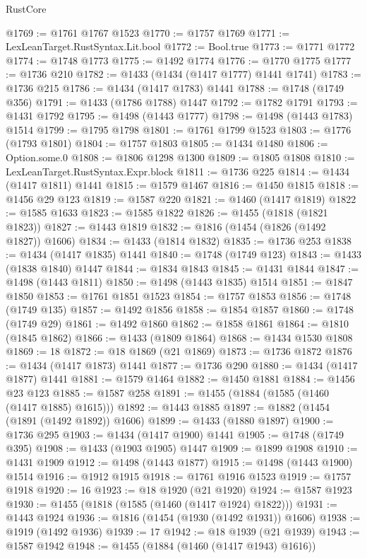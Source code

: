 \begin{lexlean}{RustCore}
\begin{coremodule}
@1769 := @1761 @1767 @1523
@1770 := @1757 @1769
@1771 := LexLeanTarget.RustSyntax.Lit.bool
@1772 := Bool.true
@1773 := @1771 @1772
@1774 := @1748 @1773
@1775 := @1492 @1774
@1776 := @1770 @1775
@1777 := @1736 @210
@1782 := @1433 (@1434 (@1417 @1777) @1441 @1741)
@1783 := @1736 @215
@1786 := @1434 (@1417 @1783) @1441
@1788 := @1748 (@1749 @356)
@1791 := @1433 (@1786 @1788) @1447
@1792 := @1782 @1791
@1793 := @1431 @1792
@1795 := @1498 (@1443 @1777)
@1798 := @1498 (@1443 @1783) @1514
@1799 := @1795 @1798
@1801 := @1761 @1799 @1523
@1803 := @1776 (@1793 @1801)
@1804 := @1757 @1803
@1805 := @1434 @1480
@1806 := Option.some.{0}
@1808 := @1806 @1298 @1300
@1809 := @1805 @1808
@1810 := LexLeanTarget.RustSyntax.Expr.block
@1811 := @1736 @225
@1814 := @1434 (@1417 @1811) @1441
@1815 := @1579 @1467
@1816 := @1450 @1815
@1818 := @1456 @29 @123
@1819 := @1587 @220
@1821 := @1460 (@1417 @1819)
@1822 := @1585 @1633
@1823 := @1585 @1822
@1826 := @1455 (@1818 (@1821 @1823))
@1827 := @1443 @1819
@1832 := @1816 (@1454 (@1826 (@1492 @1827)) @1606)
@1834 := @1433 (@1814 @1832)
@1835 := @1736 @253
@1838 := @1434 (@1417 @1835) @1441
@1840 := @1748 (@1749 @123)
@1843 := @1433 (@1838 @1840) @1447
@1844 := @1834 @1843
@1845 := @1431 @1844
@1847 := @1498 (@1443 @1811)
@1850 := @1498 (@1443 @1835) @1514
@1851 := @1847 @1850
@1853 := @1761 @1851 @1523
@1854 := @1757 @1853
@1856 := @1748 (@1749 @135)
@1857 := @1492 @1856
@1858 := @1854 @1857
@1860 := @1748 (@1749 @29)
@1861 := @1492 @1860
@1862 := @1858 @1861
@1864 := @1810 (@1845 @1862)
@1866 := @1433 (@1809 @1864)
@1868 := @1434 @1530 @1808
@1869 := 18
@1872 := @18 @1869 (@21 @1869)
@1873 := @1736 @1872
@1876 := @1434 (@1417 @1873) @1441
@1877 := @1736 @290
@1880 := @1434 (@1417 @1877) @1441
@1881 := @1579 @1464
@1882 := @1450 @1881
@1884 := @1456 @23 @123
@1885 := @1587 @258
@1891 := @1455 (@1884 (@1585 (@1460 (@1417 @1885) @1615)))
@1892 := @1443 @1885
@1897 := @1882 (@1454 (@1891 (@1492 @1892)) @1606)
@1899 := @1433 (@1880 @1897)
@1900 := @1736 @295
@1903 := @1434 (@1417 @1900) @1441
@1905 := @1748 (@1749 @395)
@1908 := @1433 (@1903 @1905) @1447
@1909 := @1899 @1908
@1910 := @1431 @1909
@1912 := @1498 (@1443 @1877)
@1915 := @1498 (@1443 @1900) @1514
@1916 := @1912 @1915
@1918 := @1761 @1916 @1523
@1919 := @1757 @1918
@1920 := 16
@1923 := @18 @1920 (@21 @1920)
@1924 := @1587 @1923
@1930 := @1455 (@1818 (@1585 (@1460 (@1417 @1924) @1822)))
@1931 := @1443 @1924
@1936 := @1816 (@1454 (@1930 (@1492 @1931)) @1606)
@1938 := @1919 (@1492 @1936)
@1939 := 17
@1942 := @18 @1939 (@21 @1939)
@1943 := @1587 @1942
@1948 := @1455 (@1884 (@1460 (@1417 @1943) @1616))

\end{coremodule}
\end{lexlean}
